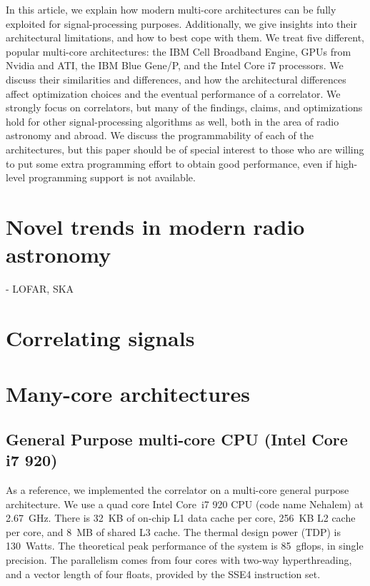 \documentclass{article}
\begin{document}
In this article, we explain how modern multi-core architectures can be fully
exploited for signal-processing purposes.
Additionally, we give insights into their architectural limitations, and how
to best cope with them.
We treat five different, popular multi-core architectures: the IBM Cell
Broadband Engine, GPUs from Nvidia and ATI, the IBM Blue Gene/P, and
the Intel Core i7 processors.
We discuss their similarities and differences, and how the architectural
differences affect optimization choices and the eventual performance of a
correlator.
We strongly focus on correlators, but many of the findings, claims, and
optimizations hold for other signal-processing algorithms as well, both in the
area of radio astronomy and abroad.
We discuss the programmability of each of the architectures, but this paper
should be of special interest to those who are willing to put some extra
programming effort to obtain good performance, even if high-level programming
support is not available.


\section{Novel trends in modern radio astronomy}
    - LOFAR, SKA

\section{Correlating signals}


\section{Many-core architectures}

\subsection{General Purpose multi-core CPU (Intel Core i7 920)}

As a reference, we implemented the correlator on a multi-core general
purpose architecture. We use a quad core Intel Core~i7 920 CPU
(code name Nehalem) at 2.67~GHz. 
There is 32~KB of on-chip L1 data cache per core, 256~KB L2 cache per core, and 8~MB
of shared L3 cache.  
The thermal design power (TDP) is 130~Watts.
The theoretical
peak performance of the system is 85~gflops, in single precision.
The parallelism comes from four cores with two-way hyperthreading, and a vector length of four floats,
provided by the SSE4 instruction set.  
\end{document}
